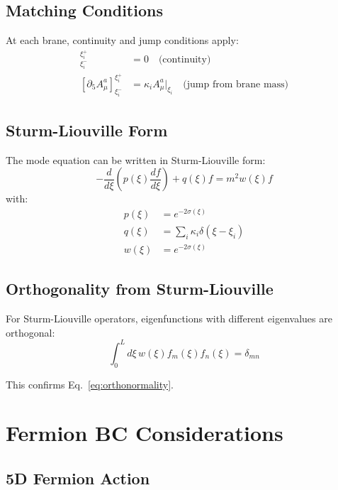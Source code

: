 \documentclass[11pt,a4paper]{article}
\begin{document}
\subsection{Matching Conditions}

At each brane, continuity and jump conditions apply:
\begin{align}
  [A_\mu^a]_{\xi_i^-}^{\xi_i^+} &= 0 \quad \text{(continuity)}
  \label{eq:continuity} \\
  [\partial_5 A_\mu^a]_{\xi_i^-}^{\xi_i^+} &= \kappa_i A_\mu^a|_{\xi_i}
    \quad \text{(jump from brane mass)}
  \label{eq:jump-mass}
\end{align}

\subsection{Sturm-Liouville Form}

The mode equation can be written in Sturm-Liouville form:
\begin{equation}
  -\frac{d}{d\xi}\left( p(\xi) \frac{df}{d\xi} \right) + q(\xi) f = m^2 w(\xi) f
  \label{eq:sturm-liouville}
\end{equation}
with:
\begin{align}
  p(\xi) &= e^{-2\sigma(\xi)}
  \label{eq:sl-p} \\
  q(\xi) &= \sum_i \kappa_i \delta(\xi - \xi_i)
  \label{eq:sl-q} \\
  w(\xi) &= e^{-2\sigma(\xi)}
  \label{eq:sl-w}
\end{align}

\subsection{Orthogonality from Sturm-Liouville}

For Sturm-Liouville operators, eigenfunctions with different eigenvalues are orthogonal:
\begin{equation}
  \int_0^L d\xi \, w(\xi) f_m(\xi) f_n(\xi) = \delta_{mn}
  \label{eq:sl-orthogonality}
\end{equation}

This confirms Eq.~\eqref{eq:orthonormality}.

\section{Fermion BC Considerations}
\label{app:fermion}

\subsection{5D Fermion Action}
\end{document}

